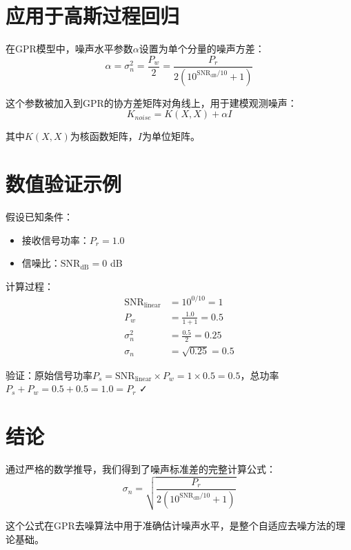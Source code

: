 \documentclass[12pt]{article}
\begin{document}
\section{应用于高斯过程回归}

在GPR模型中，噪声水平参数$\alpha$设置为单个分量的噪声方差：
\begin{equation}
\alpha = \sigma_n^2 = \frac{P_w}{2} = \frac{P_r}{2(10^{\text{SNR}_{\text{dB}}/10} + 1)}
\end{equation}

这个参数被加入到GPR的协方差矩阵对角线上，用于建模观测噪声：
\begin{equation}
K_{noise} = K(X,X) + \alpha I
\end{equation}

其中$K(X,X)$为核函数矩阵，$I$为单位矩阵。

\section{数值验证示例}

假设已知条件：
\begin{itemize}
\item 接收信号功率：$P_r = 1.0$
\item 信噪比：$\text{SNR}_{\text{dB}} = 0$ dB
\end{itemize}

计算过程：
\begin{align}
\text{SNR}_{\text{linear}} &= 10^{0/10} = 1 \\
P_w &= \frac{1.0}{1 + 1} = 0.5 \\
\sigma_n^2 &= \frac{0.5}{2} = 0.25 \\
\sigma_n &= \sqrt{0.25} = 0.5
\end{align}

验证：原始信号功率$P_s = \text{SNR}_{\text{linear}} \times P_w = 1 \times 0.5 = 0.5$，总功率$P_s + P_w = 0.5 + 0.5 = 1.0 = P_r$ ✓

\section{结论}

通过严格的数学推导，我们得到了噪声标准差的完整计算公式：
\begin{equation}
\boxed{\sigma_n = \sqrt{\frac{P_r}{2(10^{\text{SNR}_{\text{dB}}/10} + 1)}}}
\end{equation}

这个公式在GPR去噪算法中用于准确估计噪声水平，是整个自适应去噪方法的理论基础。
\end{document}
